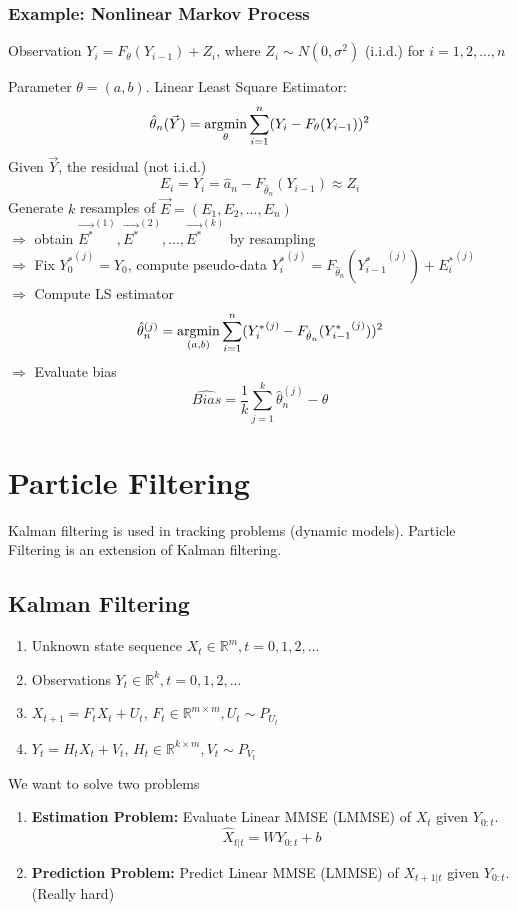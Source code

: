 \documentclass[11pt,a4paper]{article}
\newcommand{\argmin}{\operatornamewithlimits{argmin}}
\begin{document}
\subsubsection*{Example: Nonlinear Markov Process}
Observation $Y_i=F_{\theta}(Y_{i-1})+Z_i$, where $Z_i\sim N(0,\sigma^2)$ (i.i.d.) for $i=1,2,...,n$

Parameter $\theta=(a,b)$. Linear Least Square Estimator:
$$\hat{\theta}_n(\vec{Y})=\argmin_{\theta}\sum_{i=1}^n(Y_i-F_{\theta}(Y_{i-1}))^2$$
Given $\vec{Y}$, the residual (not i.i.d.)$$E_i=Y_i=\hat{a}_n-F_{\hat{\theta}_n}(Y_{i-1})\approx Z_i$$
Generate $k$ resamples of $\vec{E}=(E_1,E_2,...,E_n)$\\
$\Rightarrow$ obtain $\vec{E^*}^{(1)},\vec{E^*}^{(2)},...,\vec{E^*}^{(k)}$ by resampling\\
$\Rightarrow$ Fix ${Y_0^*}^{(j)}=Y_0$, compute pseudo-data ${Y_i^*}^{(j)}=F_{\hat{\theta}_n}({Y^*_{i-1}}^{(j)})+{E_i^*}^{(j)}$\\
$\Rightarrow$ Compute LS estimator $$\hat{\theta}_n^{(j)}=\argmin_{(a,b)}\sum_{i=1}^n({Y_i^*}^{(j)}-F_{\hat{\theta}_n}({Y^*_{i-1}}^{(j)}))^2$$
$\Rightarrow$ Evaluate bias $$\widehat{Bias}=\frac{1}{k}\sum_{j=1}^k \hat{\theta}_n^{(j)}-\theta$$


\section{Particle Filtering}
Kalman filtering is used in tracking problems (dynamic models). Particle Filtering is an extension of Kalman filtering.
\subsection{Kalman Filtering}
\begin{enumerate}
    \item Unknown state sequence $X_t\in \mathbb{R}^m,t=0,1,2,...$
    \item Observations $Y_t\in \mathbb{R}^k,t=0,1,2,...$
    \item $X_{t+1}=F_tX_t+U_t$, $F_t\in \mathbb{R}^{m\times m}, U_t\sim P_{U_t}$
    \item $Y_t=H_tX_t+V_t$, $H_t\in \mathbb{R}^{k\times m}, V_t\sim P_{V_t}$
\end{enumerate}

We want to solve two problems
\begin{enumerate}
    \item \textbf{Estimation Problem:} Evaluate Linear MMSE (LMMSE) of $X_t$ given $Y_{0:t}$. $$\hat{X}_{t|t}=WY_{0:t}+b$$
    \item \textbf{Prediction Problem:} Predict Linear MMSE (LMMSE) of $X_{t+1|t}$ given $Y_{0:t}$. (Really hard)
\end{enumerate}
\end{document}
